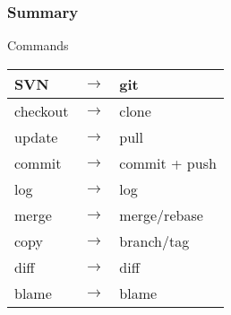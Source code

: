 \begin{frame}
	\frametitle{Summary}
	\begin{block}{Commands}
		\begin{center}
			\begin{small}
				\begin{tabular}{|lcl|}
					\hline
					SVN & $\rightarrow$ & git \\
					\hline
					checkout & $\rightarrow$ & clone \\
					update & $\rightarrow$ & pull \\
					commit & $\rightarrow$ & commit + push \\
					log & $\rightarrow$ & log \\
					merge & $\rightarrow$ & merge/rebase \\
					copy & $\rightarrow$ & branch/tag \\
					diff & $\rightarrow$ & diff \\
					blame & $\rightarrow$ & blame \\
					\hline
				\end{tabular}
			\end{small}
		\end{center}
	\end{block}
\end{frame}
